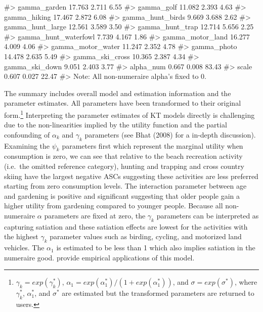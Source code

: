 \begin{Schunk}
\begin{Soutput}
#> gamma_garden           17.763   2.711   6.55
#> gamma_golf             11.082   2.393   4.63
#> gamma_hiking           17.467   2.872   6.08
#> gamma_hunt_birds        9.669   3.688   2.62
#> gamma_hunt_large       12.561   3.589   3.50
#> gamma_hunt_trap        12.714   5.656   2.25
#> gamma_hunt_waterfowl    7.739   4.167   1.86
#> gamma_motor_land       16.277   4.009   4.06
#> gamma_motor_water      11.247   2.352   4.78
#> gamma_photo            14.478   2.635   5.49
#> gamma_ski_cross        10.365   2.387   4.34
#> gamma_ski_down          9.051   2.403   3.77
#> alpha_num               0.667   0.008  83.43
#> scale                   0.607   0.027  22.47
#> Note: All non-numeraire alpha's fixed to 0.
\end{Soutput}
\end{Schunk}

The summary includes overall model and estimation information and the
parameter estimates. All parameters have been transformed to their
original form.\footnote{\(\gamma_k = exp(\gamma^*_k)\),
  \(\alpha_1 = exp(\alpha^*_1)/(1 + exp(\alpha^*_1))\), and
  \(\sigma = exp(\sigma^*)\), where \(\gamma^*_k\), \(\alpha^*_1\), and
  \(\sigma^*\) are estimated but the transformed parameters are returned
  to users.} Interpreting the parameter estimates of KT models directly
is challenging due to the non-linearities implied by the utility
function and the partial confounding of \(\alpha_k\) and \(\gamma_k\)
parameters (see Bhat (2008) for a in-depth discussion). Examining the
\(\psi_k\) parameters first which represent the marginal utility when
consumption is zero, we can see that relative to the beach recreation
activity (i.e.~the omitted reference category), hunting and trapping and
cross country skiing have the largest negative ASCs suggesting these
activities are less preferred starting from zero consumption levels. The
interaction parameter between age and gardening is positive and
significant suggesting that older people gain a higher utility from
gardening compared to younger people. Because all non-numeraire
\(\alpha\) parameters are fixed at zero, the \(\gamma_k\) parameters can
be interpreted as capturing satiation and these satiation effects are
lowest for the activities with the highest \(\gamma_k\) parameter values
such as birding, cycling, and motorized land vehicles. The \(\alpha_1\)
is estimated to be less than 1 which also implies satiation in the
numeraire good. \citet{bhatmultiple2008, lloyd-smithdecoupling2019}
provide empirical applications of this model.

